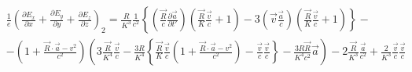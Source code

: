 \documentclass[11pt]{article}
\begin{document}
\[\begin{align}
  & \frac{1}{e}{{\left( \frac{\partial {{E}_{x}}}{\partial x}+\frac{\partial {{E}_{y}}}{\partial y}+\frac{\partial {{E}_{z}}}{\partial z} \right)}_{2}}=\frac{R}{{{K}^{3}}}\frac{1}{{{c}^{2}}}\left\{ \left( \frac{\overrightarrow{R}}{c}\frac{\partial \overrightarrow{a}}{\partial t'} \right)\left( \frac{\overrightarrow{R}}{K}\frac{\overrightarrow{v}}{c}+1 \right)-3\left( \overrightarrow{v}\frac{\overrightarrow{a}}{c} \right)\left( \frac{\overrightarrow{R}}{K}\frac{\overrightarrow{v}}{c}+1 \right) \right\}- \\
 & -\left( 1+\frac{\overrightarrow{R}\cdot \overrightarrow{a}-{{v}^{2}}}{{{c}^{2}}} \right)\left( 3\frac{\overrightarrow{R}}{{{K}^{4}}}\frac{\overrightarrow{v}}{c}-\frac{3R}{{{K}^{4}}}\left\{ \frac{\overrightarrow{R}}{K}\frac{\overrightarrow{v}}{c}\left( 1+\frac{\overrightarrow{R}\cdot \overrightarrow{a}-{{v}^{2}}}{{{c}^{2}}} \right)-\frac{\overrightarrow{v}}{c}\frac{\overrightarrow{v}}{c} \right\}-\frac{3R\overrightarrow{R}}{{{K}^{4}}{{c}^{2}}}\overrightarrow{a} \right)-2\frac{\overrightarrow{R}}{{{K}^{3}}}\frac{\overrightarrow{a}}{{{c}^{2}}}+\frac{2}{{{K}^{3}}}\frac{\overrightarrow{v}}{c}\frac{\overrightarrow{v}}{c} \\
\end{align}\]
\end{document}
